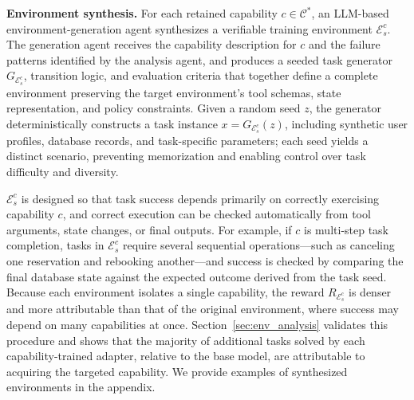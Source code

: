 \noindent\textbf{Environment synthesis.}
For each retained capability $c \in \mathcal{C}^{*}$, an LLM-based environment-generation agent synthesizes a verifiable training environment $\mathcal{E}_s^c$. The generation agent receives the capability description for $c$ and the failure patterns identified by the analysis agent, and produces a seeded task generator $G_{\mathcal{E}_s^c}$, transition logic, and evaluation criteria that together define a complete environment preserving the target environment's tool schemas, state representation, and policy constraints. Given a random seed $z$, the generator deterministically constructs a task instance $x = G_{\mathcal{E}_s^c}(z)$, including synthetic user profiles, database records, and task-specific parameters; each seed yields a distinct scenario, preventing memorization and enabling control over task difficulty and diversity.

$\mathcal{E}_s^c$ is designed so that task success depends primarily on correctly exercising capability $c$, and correct execution can be checked automatically from tool arguments, state changes, or final outputs. For example, if $c$ is multi-step task completion, tasks in $\mathcal{E}_s^c$ require several sequential operations---such as canceling one reservation and rebooking another---and success is checked by comparing the final database state against the expected outcome derived from the task seed. Because each environment isolates a single capability, the reward $R_{\mathcal{E}_s^c}$ is denser and more attributable than that of the original environment, where success may depend on many capabilities at once. Section~\ref{sec:env_analysis} validates this procedure and shows that the majority of additional tasks solved by each capability-trained adapter, relative to the base model, are attributable to acquiring the targeted capability. We provide examples of synthesized environments in the appendix. 
